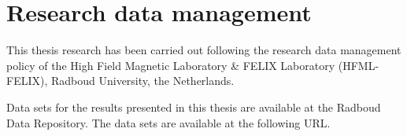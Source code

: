\chapter{Research data management}

This thesis research has been carried out following the research data management policy of the High Field Magnetic Laboratory \& FELIX Laboratory (HFML-FELIX), Radboud University, the Netherlands. 

Data sets for the results presented in this thesis are available at the Radboud Data Repository. The data sets are available at the following URL.